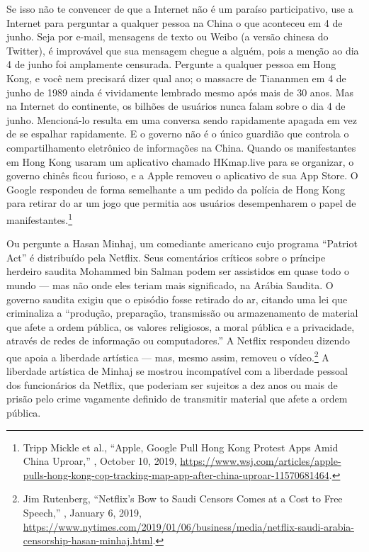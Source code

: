 Se isso não te convencer de que a Internet não é um paraíso participativo, use a
Internet para perguntar a qualquer pessoa na China o que aconteceu em 4 de junho.
Seja por e-mail, mensagens de texto ou Weibo (a versão chinesa do Twitter), é
improvável que sua mensagem chegue a alguém, pois a menção ao dia 4 de junho foi
amplamente censurada. Pergunte a qualquer pessoa em Hong Kong, e você nem precisará
dizer qual ano; o massacre de Tiananmen em 4 de junho de 1989 ainda é vividamente
lembrado mesmo após mais de 30 anos. Mas na Internet do continente, os bilhões de
usuários nunca falam sobre o dia 4 de junho. Mencioná-lo resulta em uma conversa
sendo rapidamente apagada em vez de se espalhar rapidamente. E o governo não é o
único guardião que controla o compartilhamento eletrônico de informações na China.
Quando os manifestantes em Hong Kong usaram um aplicativo chamado HKmap.live para
se organizar, o governo chinês ficou furioso, e a Apple removeu o aplicativo de sua
App Store. O Google respondeu de forma semelhante a um pedido da polícia de Hong Kong
para retirar do ar um jogo que permitia aos usuários desempenharem o papel de
manifestantes.\footnote{Tripp Mickle et al., ``Apple, Google Pull Hong Kong Protest
Apps Amid China Uproar,'' , October 10, 2019,
\url{https://www.wsj.com/articles/apple-pulls-hong-kong-cop-tracking-map-app-after-china-uproar-11570681464}.}

Ou pergunte a Hasan Minhaj, um comediante americano cujo programa ``Patriot Act'' é
distribuído pela Netflix. Seus comentários críticos sobre o príncipe herdeiro saudita
Mohammed bin Salman podem ser assistidos em quase todo o mundo --- mas não onde eles
teriam mais significado, na Arábia Saudita. O governo saudita exigiu que o episódio
fosse retirado do ar, citando uma lei que criminaliza a ``produção, preparação,
transmissão ou armazenamento de material que afete a ordem pública, os valores
religiosos, a moral pública e a privacidade, através de redes de informação ou
computadores.'' A Netflix respondeu dizendo que apoia a liberdade artística --- mas,
mesmo assim, removeu o vídeo.\footnote{Jim Rutenberg, ``Netflix’s Bow to Saudi Censors
Comes at a Cost to Free Speech,'' , January 6, 2019,
\url{https://www.nytimes.com/2019/01/06/business/media/netflix-saudi-arabia-censorship-hasan-minhaj.html}.}
A liberdade artística de Minhaj se mostrou incompatível com a liberdade pessoal dos
funcionários da Netflix, que poderiam ser sujeitos a dez anos ou mais de prisão pelo
crime vagamente definido de transmitir material que afete a ordem pública.

